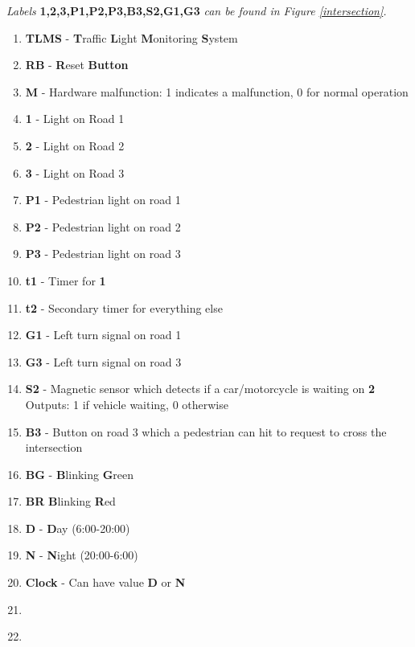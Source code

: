 \documentclass[letterpaper]{article}
\begin{document}
\textit{Labels}
\textbf{1,2,3,P1,P2,P3,B3,S2,G1,G3}
\textit{can be found in Figure \ref{intersection}.}
\begin{enumerate}

 \item \textbf{TLMS} -
       \textbf{T}raffic
       \textbf{L}ight
       \textbf{M}onitoring
       \textbf{S}ystem
       
 \item \textbf{RB} -
       \textbf{R}eset
       \textbf{Button}
 \item \textbf{M} - Hardware malfunction: 1 indicates a malfunction, 0 for normal operation
 \item \textbf{1} - Light on Road 1
 \item \textbf{2} - Light on Road 2
 \item \textbf{3} - Light on Road 3
 \item \textbf{P1} - Pedestrian light on road 1
 \item \textbf{P2} - Pedestrian light on road 2
 \item \textbf{P3} - Pedestrian light on road 3
 \item \textbf{t1} - Timer for \textbf{1}
 \item \textbf{t2} - Secondary timer for everything else
 \item \textbf{G1} - Left turn signal on road 1
 \item \textbf{G3} - Left turn signal on road 3
 \item \textbf{S2} - Magnetic sensor which detects if a car/motorcycle is waiting on \textbf{2}\\
       Outputs: 1 if vehicle waiting, 0 otherwise
 \item \textbf{B3} - Button on road 3 which a pedestrian can hit to request to cross the intersection
 \item \textbf{BG} -
       \textbf{B}linking
       \textbf{G}reen
 \item \textbf{BR}
       \textbf{B}linking
       \textbf{R}ed
 \item \textbf{D} - \textbf{D}ay (6:00-20:00)
 \item \textbf{N} - \textbf{N}ight (20:00-6:00)
 \item \textbf{Clock} - Can have value \textbf{D} or \textbf{N}
 \item \textbf{}
 \item \textbf{}
       
       
\end{enumerate}
\end{document}
